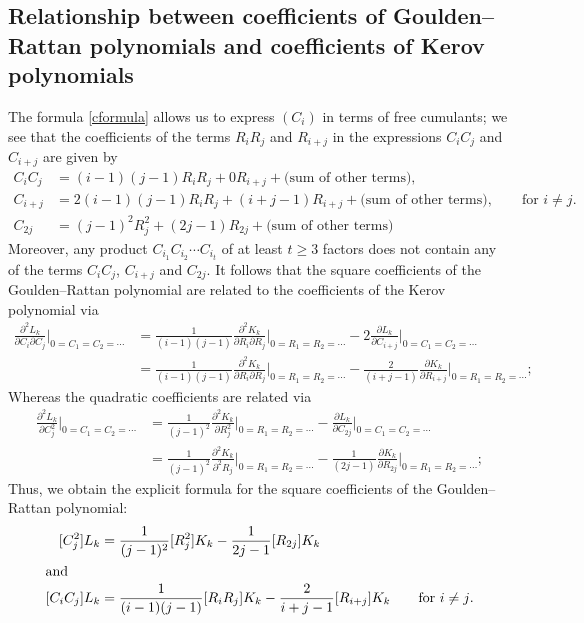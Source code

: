 \documentclass[submission]{FPSAC2021}
\begin{document}
\subsection{Relationship between coefficients 
of Goulden--Rattan polynomials 
and coefficients of Kerov polynomials}

The formula \eqref{cformula} allows us to 
express $(C_i)$ in terms of free cumulants;
we see that the coefficients of the terms 
$R_i R_j$ and $R_{i+j}$ in the expressions
$C_{i} C_{j}$ and $C_{i+j}$ are given by
\begin{align*}
C_i C_j &= (i-1)(j-1) R_i R_j + 0  R_{i+j} + \text{(sum of other terms)},\\
C_{i+j} &=2(i-1)(j-1)R_iR_j+(i+j-1)R_{i+j}+\text{(sum of other terms)}, 
\qquad \text{for $i\neq j$.}\\
C_{2j} &=(j-1)^2R_j^2+(2j-1)R_{2j}+\text{(sum of other terms)} 
\end{align*}
Moreover, any product $C_{i_1} C_{i_2}\cdots C_{i_t}$
of at least $t\geq 3$ factors does not contain any 
of the terms $C_i C_j$, $C_{i+j}$ and $C_{2j}$.
It follows that the square coefficients of 
the Goulden--Rattan polynomial are related 
to the coefficients of the Kerov polynomial via
\begin{align*}
\frac{\partial^2L_k}{\partial{C_i}\partial{C_j}}\Bigg|_{0=C_1=C_2=\cdots}
&=\frac{1}{(i-1)(j-1)}\frac{\partial^2K_k}{\partial{R_i}\partial{R_j}}\Bigg|_{0=R_1=R_2=\cdots}
-2\frac{\partial L_k}{\partial{C_{i+j}}}\Bigg|_{0=C_1=C_2=\cdots}\\
&=\frac{1}{(i-1)(j-1)}\frac{\partial^2K_k}{\partial{R_i}\partial{R_j}}\Bigg|_{0=R_1=R_2=\cdots}
-\frac{2}{(i+j-1)}\frac{\partial K_k}{\partial{R_{i+j}}}\Bigg|_{0=R_1=R_2=\cdots};
\end{align*}
Whereas the quadratic coefficients are related via
\begin{align*}
\frac{\partial^2L_k}{\partial{C_j^2}}\Bigg|_{0=C_1=C_2=\cdots}
&=\frac{1}{(j-1)^2}\frac{\partial^2K_k}{\partial{R_j^2}}\Bigg|_{0=R_1=R_2=\cdots}
-\frac{\partial L_k}{\partial{C_{2j}}}\Bigg|_{0=C_1=C_2=\cdots}\\
&=\frac{1}{(j-1)^2}\frac{\partial^2K_k}{\partial^2{R_j}}\Bigg|_{0=R_1=R_2=\cdots}
-\frac{1}{(2j-1)}\frac{\partial K_k}{\partial{R_{2j}}}\Bigg|_{0=R_1=R_2=\cdots};
\end{align*}
Thus, we obtain the explicit formula for 
the square coefficients of the Goulden–Rattan polynomial:
\begin{align}
\label{formula}
[C_j^2]L_k &=\frac{1}{(j-1)^2}[R_j^2]K_k-\frac{1}{2j-1}[R_{2j}]K_k \\
\intertext{and}
[C_iC_j]L_k &=\frac{1}{(i-1)(j-1)}[R_iR_j]K_k-\frac{2}{i+j-1}[R_{i+j}]K_k
\qquad \text{for $i\neq j$.}
\end{align}
\end{document}
